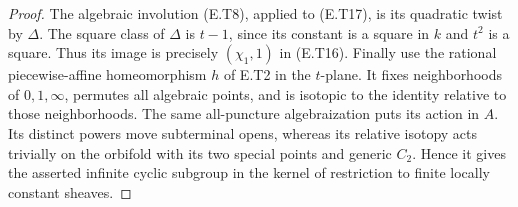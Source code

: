 \begin{proof}
The algebraic involution (E.T8), applied to (E.T17),
is its quadratic twist by $\Delta$.
The square class of $\Delta$ is $t-1$, since its
constant is a square in $k$ and $t^2$ is a square.
Thus its image is precisely $(\chi_1,1)$ in (E.T16).
Finally use the rational piecewise-affine homeomorphism
$h$ of E.T2 in the $t$-plane.  It fixes neighborhoods
of $0,1,\infty$, permutes all algebraic points, and
is isotopic to the identity relative to those
neighborhoods.  The same all-puncture algebraization
puts its action in $A$.  Its distinct powers move
subterminal opens, whereas its relative isotopy acts
trivially on the orbifold with its two special points
and generic $C_2$.  Hence it gives the asserted
infinite cyclic subgroup in the kernel of restriction
to finite locally constant sheaves.
\end{proof}
